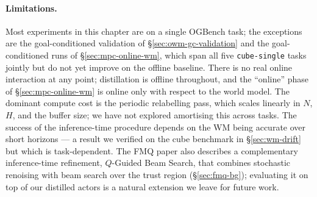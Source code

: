 \paragraph{Limitations.}
Most experiments in this chapter are on a single OGBench task; the
exceptions are the goal-conditioned validation of
\S\ref{sec:owm-gc-validation} and the goal-conditioned runs of
\S\ref{sec:mpc-online-wm}, which span all five \texttt{cube-single}
tasks jointly but do not yet improve on the offline baseline. There is
no real online interaction at any point; distillation is offline
throughout, and the ``online'' phase of \S\ref{sec:mpc-online-wm} is
online only with respect to the world model. The dominant compute
cost is the periodic relabelling pass, which scales linearly in $N$,
$H$, and the buffer size; we have not explored amortising this across
tasks. The success of the inference-time procedure depends on the WM
being accurate over short horizons --- a result we verified on the
cube benchmark in \S\ref{sec:wm-drift} but which is task-dependent.
The FMQ paper also describes a complementary inference-time refinement,
$Q$-Guided Beam Search, that combines stochastic renoising with beam
search over the trust region (\S\ref{sec:fmq-bg}); evaluating it on
top of our distilled actors is a natural extension we leave for
future work.
